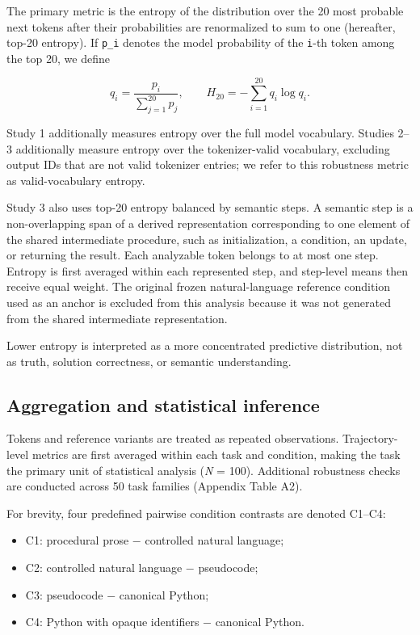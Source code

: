 \documentclass[sn-mathphys-num]{sn-jnl}
\begin{document}
The primary metric is the entropy of the distribution over the 20 most probable next tokens after their probabilities are renormalized to sum to one (hereafter, top-20 entropy). If \texttt{p\_i} denotes the model probability of the \texttt{i}-th token among the top 20, we define

\[
q_i = \frac{p_i}{\sum_{j=1}^{20} p_j}, \qquad
H_{20} = -\sum_{i=1}^{20} q_i \log q_i.
\]

Study 1 additionally measures entropy over the full model vocabulary. Studies 2--3 additionally measure entropy over the tokenizer-valid vocabulary, excluding output IDs that are not valid tokenizer entries; we refer to this robustness metric as valid-vocabulary entropy.

Study 3 also uses top-20 entropy balanced by semantic steps. A semantic step is a non-overlapping span of a derived representation corresponding to one element of the shared intermediate procedure, such as initialization, a condition, an update, or returning the result. Each analyzable token belongs to at most one step. Entropy is first averaged within each represented step, and step-level means then receive equal weight. The original frozen natural-language reference condition used as an anchor is excluded from this analysis because it was not generated from the shared intermediate representation.

Lower entropy is interpreted as a more concentrated predictive distribution, not as truth, solution correctness, or semantic understanding.

\subsection{Aggregation and statistical inference}

Tokens and reference variants are treated as repeated observations. Trajectory-level metrics are first averaged within each task and condition, making the task the primary unit of statistical analysis (\emph{N} = 100). Additional robustness checks are conducted across 50 task families (Appendix Table A2).

For brevity, four predefined pairwise condition contrasts are denoted C1--C4:

\begin{itemize}
\item C1: procedural prose $-$ controlled natural language;
\item C2: controlled natural language $-$ pseudocode;
\item C3: pseudocode $-$ canonical Python;
\item C4: Python with opaque identifiers $-$ canonical Python.
\end{itemize}
\end{document}
